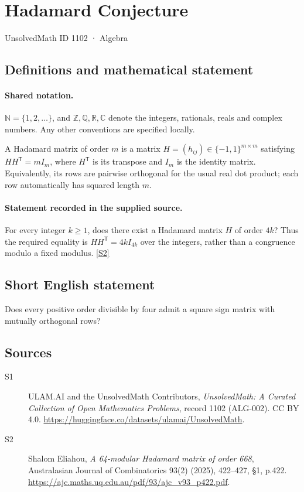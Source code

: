 \documentclass[11pt]{article}
\newcommand{\sref}[2]{\hyperlink{source:#1:#2}{[S#2]}}
\begin{document}
\setcounter{section}{1101}
\section{Hadamard Conjecture}\label{1102}
{\small\sffamily UnsolvedMath ID 1102 · Algebra}
\subsection{Definitions and mathematical statement}

\paragraph{Shared notation.}$\mathbb N=\{1,2,\ldots\}$, and $\mathbb Z,\mathbb Q,\mathbb R,\mathbb C$ denote the integers, rationals, reals and complex numbers. Any other conventions are specified locally.


A Hadamard matrix of order $m$ is a matrix $H=(h_{ij})\in\{-1,1\}^{m\times m}$ satisfying $HH^{\mathsf T}=mI_m$, where $H^{\mathsf T}$ is its transpose and $I_m$ is the identity matrix. Equivalently, its rows are pairwise orthogonal for the usual real dot product; each row automatically has squared length $m$.
\paragraph{Statement recorded in the supplied source.}
For every integer $k\geq1$, does there exist a Hadamard matrix $H$ of order $4k$? Thus the required equality is $HH^{\mathsf T}=4kI_{4k}$ over the integers, rather than a congruence modulo a fixed modulus. \sref{1102}{2}
\subsection{Short English statement}
Does every positive order divisible by four admit a square sign matrix with mutually orthogonal rows?
\subsection{Sources}
\begin{description}
\item[\hypertarget{source:1102:1}{S1}] ULAM.AI and the UnsolvedMath Contributors, \emph{UnsolvedMath: A Curated Collection of Open Mathematics Problems}, record 1102 (ALG-002). CC BY 4.0. \url{https://huggingface.co/datasets/ulamai/UnsolvedMath}.
\item[\hypertarget{source:1102:2}{S2}] Shalom Eliahou, \emph{A 64-modular Hadamard matrix of order 668}, Australasian Journal of Combinatorics 93(2) (2025), 422--427, §1, p.422. \url{https://ajc.maths.uq.edu.au/pdf/93/ajc_v93_p422.pdf}.
\end{description}
\label{end:1102}
\end{document}
